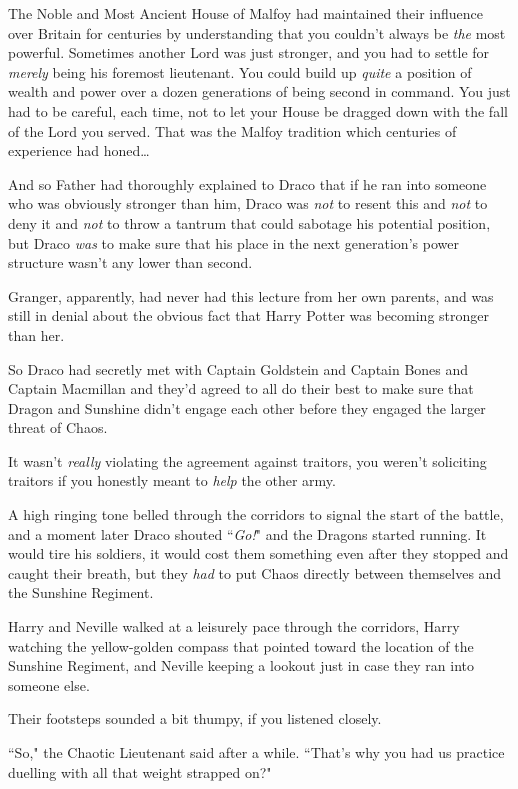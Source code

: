 The Noble and Most Ancient House of Malfoy had maintained their influence over Britain for centuries by understanding that you couldn't always be \emph{the} most powerful. Sometimes another Lord was just stronger, and you had to settle for \emph{merely} being his foremost lieutenant. You could build up \emph{quite} a position of wealth and power over a dozen generations of being second in command. You just had to be careful, each time, not to let your House be dragged down with the fall of the Lord you served. That was the Malfoy tradition which centuries of experience had honed{\ldots}

And so Father had thoroughly explained to Draco that if he ran into someone who was obviously stronger than him, Draco was \emph{not} to resent this and \emph{not} to deny it and \emph{not} to throw a tantrum that could sabotage his potential position, but Draco \emph{was} to make sure that his place in the next generation's power structure wasn't any lower than second.

Granger, apparently, had never had this lecture from her own parents, and was still in denial about the obvious fact that Harry Potter was becoming stronger than her.

So Draco had secretly met with Captain Goldstein and Captain Bones and Captain Macmillan and they'd agreed to all do their best to make sure that Dragon and Sunshine didn't engage each other before they engaged the larger threat of Chaos.

It wasn't \emph{really} violating the agreement against traitors, you weren't soliciting traitors if you honestly meant to \emph{help} the other army.

A high ringing tone belled through the corridors to signal the start of the battle, and a moment later Draco shouted ``\emph{Go!}" and the Dragons started running. It would tire his soldiers, it would cost them something even after they stopped and caught their breath, but they \emph{had} to put Chaos directly between themselves and the Sunshine Regiment.

\later

Harry and Neville walked at a leisurely pace through the corridors, Harry watching the yellow-golden compass that pointed toward the location of the Sunshine Regiment, and Neville keeping a lookout just in case they ran into someone else.

Their footsteps sounded a bit thumpy, if you listened closely.

``So," the Chaotic Lieutenant said after a while. ``That's why you had us practice duelling with all that weight strapped on?"

